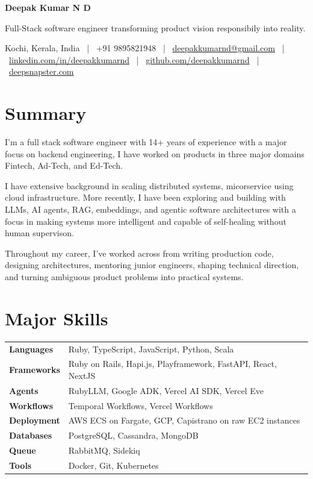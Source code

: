 \documentclass[10.5pt,a4paper]{article}
\begin{document}
{\Huge\bfseries\color{navy} Deepak Kumar N D}\par
\vspace{2pt}
{\large\color{graytext} Full-Stack software engineer transforming product vision responsibily into reality.}\par
\vspace{2pt}
{\small\color{graytext}
Kochi, Kerala, India \ | \ +91 9895821948 \ | \ \href{mailto:deepakkumarnd@gmail.com}{deepakkumarnd@gmail.com} \ | \
\href{https://linkedin.com/in/deepakkumarnd}{linkedin.com/in/deepakkumarnd} \ | \
\href{https://github.com/deepakkumarnd}{github.com/deepakkumarnd} \ | \
\href{https://deepsnapster.com}{deepsnapster.com}
}\par
\vspace{6pt}

\section{Summary}
I'm a full stack software engineer with 14+ years of experience with a major focus on backend engineering, I have worked on products in three major domains Fintech, Ad-Tech, and Ed-Tech.

I have extensive background in scaling distributed systems, micorservice using cloud infrastructure. More recently, I have been exploring and building with LLMs, AI agents, RAG, embeddings, and agentic software architectures with a focus in making systems more intelligent and capable of self-healing without human supervison.

Throughout my career, I've worked across from writing production code, designing architectures, mentoring junior engineers, shaping technical direction, and turning ambiguous product problems into practical systems.

\section{Major Skills}
\begin{tabular}{@{}p{2.05in}p{4.85in}@{}}
\textbf{Languages} & Ruby, TypeScript, JavaScript, Python, Scala \\[4pt]
\textbf{Frameworks} & Ruby on Rails, Hapi.js, Playframework, FastAPI, React, NextJS \\[4pt]
\textbf{Agents} & RubyLLM, Google ADK, Vercel AI SDK, Vercel Eve \\[4pt]
\textbf{Workflows} & Temporal Workflows, Vercel Workflows \\[4pt]
\textbf{Deployment} & AWS ECS on Fargate, GCP, Capistrano on raw EC2 instances \\[4pt]
\textbf{Databases} & PostgreSQL, Cassandra, MongoDB \\[4pt]
\textbf{Queue} & RabbitMQ, Sidekiq \\[4pt]
\textbf{Tools} & Docker, Git, Kubernetes \\
\end{tabular}
\end{document}
